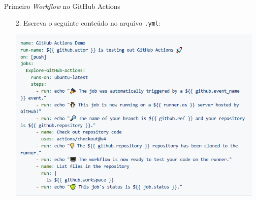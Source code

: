 \documentclass[t,serif]{beamer}
\begin{document}
	\begin{frame}{Primeiro \textit{Workflow} no GitHub Actions}
		\begin{enumerate}
			\item[2.] Escreva o seguinte conteúdo no arquivo \texttt{.yml}:
			\begin{center}
				\includegraphics[width=0.9\linewidth]{figs/3_4.png}
			\end{center}
		\end{enumerate}
	\end{frame}
	
\end{document}
